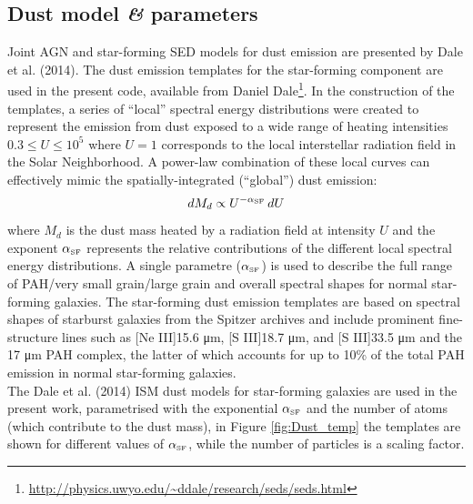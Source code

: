 \subsection{Dust model \textit{\&} parameters}
Joint AGN and star-forming SED models for dust emission are presented by Dale et al. (2014)\cite{Dale2014}. The dust emission templates for the star-forming component are used in the present code, available from Daniel Dale\footnote{\url{http://physics.uwyo.edu/~ddale/research/seds/seds.html}}.
In the construction of the templates, a series of “local” spectral energy distributions were created to represent the emission from dust exposed to a wide range of heating intensities $0.3 \leq U \leq 10^5$ where $U = 1$ corresponds to the local interstellar radiation field in the Solar Neighborhood. A power-law combination of these local curves can effectively mimic the spatially-integrated (“global”) dust emission:
\begin{equation}
     dM_d \propto U^{-\alpha_{\text{\tiny{SF}}}}\,dU
\end{equation}
where $M_d$ is the dust mass heated by a radiation field at intensity $U$ and the exponent $\alpha_{\text{\tiny{SF}}}$ represents the relative contributions of the different local spectral energy distributions. A single parametre ($\alpha_{\text{\tiny{SF}}}$) is used to describe the full range of PAH/very small grain/large grain and overall spectral shapes for normal star-forming galaxies. 
The star-forming dust emission templates are based on spectral shapes of starburst galaxies from the Spitzer archives and include prominent fine-structure lines such as [Ne III]15.6 μm, [S III]18.7 μm, and [S III]33.5 μm and the 17 μm PAH complex, the latter of which accounts for up to 10\% of the total PAH emission in normal star-forming galaxies. \\
The Dale et al. (2014)\cite{Dale2014} ISM dust models for star-forming galaxies are used in the present work, parametrised with the exponential $\alpha_{\text{\tiny{SF}}}$ and the number of atoms (which contribute to the dust mass), in Figure \ref{fig:Dust_temp} the templates are shown for different values of $\alpha_{\text{\tiny{SF}}}$, while the number of particles is a scaling factor.

